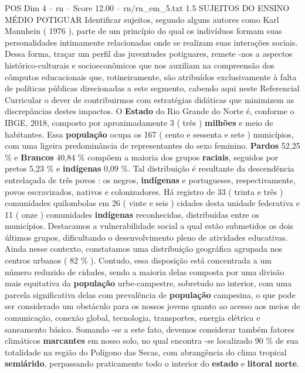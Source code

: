 \begin{textsample}{POS Dim 4 – rn – Score 12.00 – rn/rn\_em\_5.txt}  \label{ex:f4_pos_084}
1.5 SUJEITOS DO ENSINO MÉDIO POTIGUAR Identificar sujeitos, segundo alguns autores como Karl Mannhein ( 1976 ), parte de um princípio do qual os indivíduos formam suas personalidades intimamente relacionadas onde se realizam suas interações sociais.
Dessa forma, traçar um perfil das juventudes potiguares, remete -nos a aspectos histórico-culturais e socioeconômicos que nos auxiliam na compreensão dos cômputos educacionais que, rotineiramente, são atribuídos exclusivamente à falta de políticas públicas direcionadas a este segmento, cabendo aqui neste Referencial Curricular o dever de contribuirmos com estratégias didáticas que minimizem as discrepâncias destes impactos.
O \textbf{Estado} do Rio Grande do Norte é, conforme o IBGE, 2018, composto por aproximadamente 3 ( três ) \textbf{milhões} e meio de habitantes.
Essa \textbf{população} ocupa os 167 ( cento e sessenta e sete ) municípios, com uma ligeira predominância de representantes do sexo feminino. \textbf{Pardos} 52,25 \% e \textbf{Brancos} 40,84 \% compõem a maioria dos grupos \textbf{raciais}, seguidos por pretos 5,23 \% e \textbf{indígenas} 0,09 \%.
Tal distribuição é resultante da descendência entrelaçada de três povos : os negros, \textbf{indígenas} e portugueses, respectivamente, povos escravizados, nativos e colonizadores.
Há registro de 33 ( trinta e três ) comunidades quilombolas em 26 ( vinte e seis ) cidades desta unidade federativa e 11 ( onze ) comunidades \textbf{indígenas} reconhecidas, distribuídas entre os municípios.
Destacamos a vulnerabilidade social a qual estão submetidos os dois últimos grupos, dificultando o desenvolvimento pleno de atividades educativas.
Ainda nesse contexto, constatamos uma distribuição geográfica agrupada nos centros urbanos ( 82 \% ).
Contudo, essa disposição está concentrada a um número reduzido de cidades, sendo a maioria delas composta por uma divisão mais equitativa da \textbf{população} urbe-campestre, sobretudo no interior, com uma parcela significativa delas com prevalência de \textbf{população} campesina, o que pode ser considerado um obstáculo para os nossos jovens quanto ao acesso aos meios de comunicação, conexão global, tecnologia, transportes, energia elétrica e saneamento básico.
Somando -se a este fato, devemos considerar também fatores climáticos \textbf{marcantes} em nosso solo, no qual encontra -se localizado 90 \% de sua totalidade na região do Polígono das Secas, com abrangência do clima tropical \textbf{semiárido}, perpassando praticamente todo o interior do \textbf{estado} e \textbf{litoral} \textbf{norte}.

\end{textsample}
